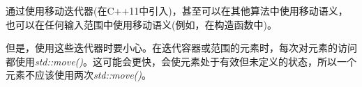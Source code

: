 通过使用移动迭代器(在C++11中引入)，甚至可以在其他算法中使用移动语义，也可以在任何输入范围中使用移动语义(例如，在构造函数中)。\par

但是，使用这些迭代器时要小心。在迭代容器或范围的元素时，每次对元素的访问都使用\textit{std::move()}。这可能会更快，会使元素处于有效但未定义的状态，所以一个元素不应该使用两次\textit{std::move()}。\par

































































